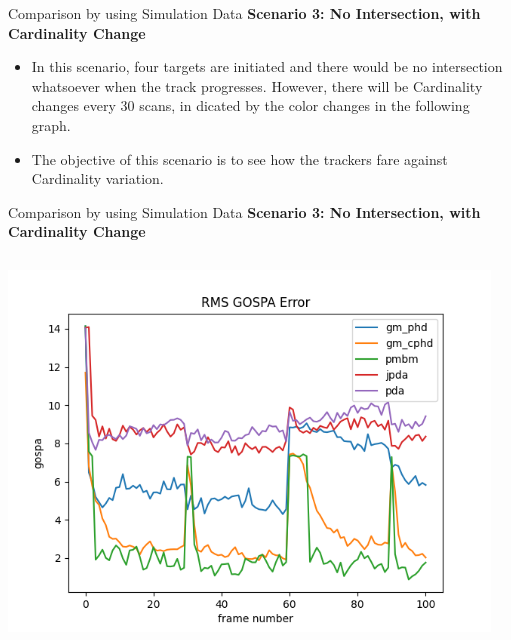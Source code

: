 \documentclass[12pt]{beamer}
\let\olditem\item
\renewcommand\item{\olditem\justifying}
\begin{document}
\begin{frame}{Comparison by using Simulation Data}
\textbf{Scenario 3: No Intersection, with Cardinality Change}
	\begin{itemize}
		    \item In this scenario, four targets are initiated and there would be no intersection whatsoever when the track progresses. However, there will be Cardinality changes every 30 scans, in dicated by the color changes in the following graph. 
		    \item The objective of this scenario is to see how the trackers fare against Cardinality variation.
	\end{itemize}
\end{frame}

\begin{frame}{Comparison by using Simulation Data}
\textbf{Scenario 3: No Intersection, with Cardinality Change}
\begin{columns}[t]
  \begin{column}{0.5\linewidth}
      \centering
      \includegraphics[width=\linewidth,height=\textheight,keepaspectratio]{real_data/scenario3/gospa.png}\\
  \end{column}
    \begin{column}{0.5\linewidth}
      \centering

\end{column}
\end{columns}
\end{frame}
\end{document}
